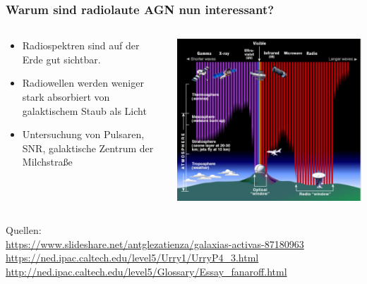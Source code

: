 \documentclass[aspectratio=1610, 9pt]{beamer}
\begin{document}
\begin{frame}\frametitle{Warum sind radiolaute AGN nun interessant?}
  \begin{columns}
  \begin{column}[c]{0.45\textwidth}
  \begin{itemize}
    \item Radiospektren sind auf der Erde gut sichtbar.
    \item Radiowellen werden weniger stark absorbiert von galaktischem Staub als Licht
    \item Untersuchung von Pulsaren, SNR, galaktische Zentrum der Milchstra\ss e
  \end{itemize}
  \end{column}
  \begin{column}[c]{0.45\textwidth}
    \includegraphics{images/durchlaessigkeit.png}
  \end{column}
  \end{columns}
\end{frame}

\begin{frame}
Quellen: \\
\url{https://www.slideshare.net/antglezatienza/galaxias-activas-87180963} \\
\url{https://ned.ipac.caltech.edu/level5/Urry1/UrryP4_3.html} \\
\url{http://ned.ipac.caltech.edu/level5/Glossary/Essay_fanaroff.html} \\

\end{frame}
\end{document}
